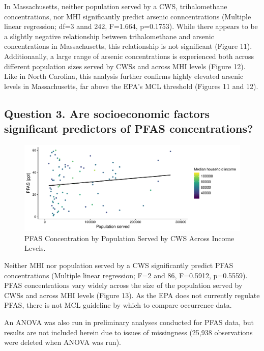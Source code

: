 \documentclass[12pt,]{article}
\begin{document}
In Massachusetts, neither population served by a CWS, trihalomethane
concentrations, nor MHI significantly predict arsenic conncentrations
(Multiple linear regression; df=3 annd 242, F=1.664, p=0.1753). While
there appears to be a slightly negative relationship between
trihalomethane and arsenic concentrations in Massachusetts, this
relationship is not significant (Figure 11). Additionanlly, a large
range of arsenic concentrations is experienced both across different
population sizes served by CWSs and across MHI levels (Figure 12). Like
in North Carolina, this analysis further confirms highly elevated
arsenic levels in Massachusetts, far above the EPA's MCL threshold
(Figures 11 and 12).

\newpage

\hypertarget{question-3.-are-socioeconomic-factors-significant-predictors-of-pfas-concentrations}{%
\subsection{Question 3. Are socioeconomic factors significant predictors
of PFAS
concentrations?}\label{question-3.-are-socioeconomic-factors-significant-predictors-of-pfas-concentrations}}

\begin{figure}
\centering
\includegraphics{Project_Template_files/figure-latex/figs13-1.pdf}
\caption{PFAS Concentration by Population Served by CWS Across Income
Levels.}
\end{figure}

Neither MHI nor population served by a CWS significantly predict PFAS
concentrations (Multiple linear regression; F=2 and 86, F=0.5912,
p=0.5559). PFAS concentrations vary widely across the size of the
population served by CWSs and across MHI levels (Figure 13). As the EPA
does not currently regulate PFAS, there is not MCL guideline by which to
compare occurrence data.

An ANOVA was also run in preliminary analyses conducted for PFAS data,
but results are not included herein due to issues of missingness (25,938
observations were deleted when ANOVA was run).
\end{document}
